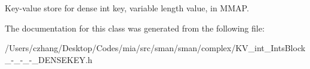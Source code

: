 Key-\/value store for dense int key, variable length value, in M\-M\-A\-P. 

The documentation for this class was generated from the following file\-:\begin{DoxyCompactItemize}
\item 
/\-Users/czhang/\-Desktop/\-Codes/mia/src/sman/sman/complex/K\-V\-\_\-int\-\_\-\-Ints\-Block\-\_\--\/\-\_\--\/\-\_\--\/\-\_\-\-D\-E\-N\-S\-E\-K\-E\-Y.\-h\end{DoxyCompactItemize}
